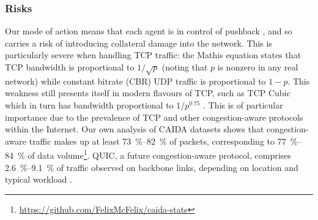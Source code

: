 \documentclass[10pt, times, comsoc]{IEEEtran}
\begin{document}
\subsubsection{Risks}
Our mode of action means that each agent is in control of pushback \cite{DBLP:journals/ccr/MahajanBFIPS02a}, and so carries a risk of introducing collateral damage into the network.
This is particularly severe when handling TCP traffic: the Mathis equation \cite{DBLP:journals/ccr/MathisSMO97} states that TCP bandwidth is proportional to $1/\sqrt{p}$ (noting that $p$ is nonzero in any real network) while constant bitrate (CBR) UDP traffic is proportional to $1 - p$.
This weakness still presents itself in modern flavours of TCP, such as TCP Cubic which in turn has bandwidth proportional to $1/p^{0.75}$ \cite{rfc8312}.
This is of particular importance due to the prevalence of TCP and other congestion-aware protocols within the Internet.
Our own analysis of CAIDA datasets \cite{caida-2018-passive} shows that congestion-aware traffic makes up at least \SIrange{73}{82}{\percent} of packets, corresponding to \SIrange{77}{84}{\percent} of data volume\footnote{\url{https://github.com/FelixMcFelix/caida-stats}}.
QUIC, a future congestion-aware protocol, comprises \SIrange{2.6}{9.1}{\percent} of traffic observed on backbone links, depending on location and typical workload \cite{DBLP:conf/pam/RuthPDH18}.
\end{document}
